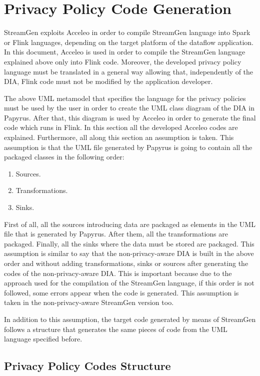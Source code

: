 \section{Privacy Policy Code Generation}

StreamGen exploits Acceleo in order to compile StreamGen language into Spark or Flink languages, depending on the target platform of the dataflow application. In this document, Acceleo is used in order to compile the StreamGen language explained above only into Flink code. Moreover, the developed privacy policy language must be translated in a general way allowing that, independently of the DIA, Flink code must not be modified by the application developer.

The above UML metamodel that specifies the language for the privacy policies must be used by the user in order to create the UML class diagram of the DIA in Papyrus. After that, this diagram is used by Acceleo in order to generate the final code which runs in Flink. In this section all the developed Acceleo codes are explained. Furthermore, all along this section an assumption is taken. This assumption is that the UML file generated by Papyrus is going to contain all the packaged classes in the following order:

\begin{enumerate}
\item Sources.
\item Transformations.
\item Sinks.
\end{enumerate}

First of all, all the sources introducing data are packaged as elements in the UML file that is generated by Papyrus. After them, all the transformations are packaged. Finally, all the sinks where the data must be stored are packaged. This assumption is similar to say that the non-privacy-aware DIA is built in the above order and without adding transformations, sinks or sources after generating the codes of the non-privacy-aware DIA. This is important because due to the approach used for the compilation of the StreamGen language, if this order is not followed, some errors appear when the code is generated. This assumption is taken in the non-privacy-aware StreamGen version too.

In addition to this assumption, the target code generated by means of StreamGen follows a structure that generates the same pieces of code from the UML language specified before.

\subsection{Privacy Policy Codes Structure}


